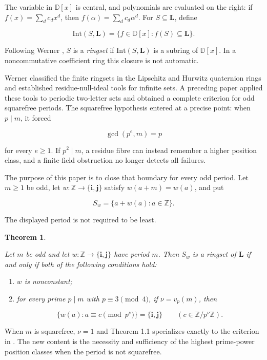 \documentclass[11pt]{article}
\newtheorem{theorem}{Theorem}[section]
\numberwithin{equation}{section}
\begin{document}
The variable in $\mathbb D[x]$ is central, and polynomials are evaluated on
the right: if $f(x)=\sum_d c_dx^d$, then
$f(\alpha)=\sum_d c_d\alpha^d$. For $S\subseteq\mathbf L$, define

\[
\mathrm{Int}(S,\mathbf L)
=\{f\in\mathbb D[x]:f(S)\subseteq\mathbf L\}.
\]

Following Werner \cite{werner2026}, $S$ is a \emph{ringset} if
$\mathrm{Int}(S,\mathbf L)$ is a subring of $\mathbb D[x]$. In a
noncommutative coefficient ring this closure is not automatic.

Werner \cite{werner2026} classified the finite ringsets in the Lipschitz and Hurwitz
quaternion rings and established residue-null-ideal tools for infinite
sets. A preceding paper \cite{carptopus2026} applied these tools to periodic two-letter sets
and obtained a complete criterion for odd squarefree periods. The
squarefree hypothesis entered at a precise point: when $p\mid m$, it forced

\[
\gcd(p^e,m)=p
\]

for every $e\ge1$. If $p^2\mid m$, a residue fibre can instead remember a
higher position class, and a finite-field obstruction no longer detects all
failures.

The purpose of this paper is to close that boundary for every odd period.
Let $m\ge1$ be odd, let $w:\mathbb Z\to\{\mathbf i,\mathbf j\}$ satisfy
$w(a+m)=w(a)$, and put

\[
S_w=\{a+w(a):a\in\mathbb Z\}.
\]

The displayed period is not required to be least.

\begin{theorem}
\label{thm:main}

Let $m$ be odd and let $w:\mathbb Z\to\{\mathbf i,\mathbf j\}$ have
period $m$. Then $S_w$ is a ringset of $\mathbf L$ if and only if both of the
following conditions hold:

\begin{enumerate}
\item $w$ is nonconstant;
\item for every prime $p\mid m$ with $p\equiv3\pmod4$, if
$\nu=v_p(m)$, then

$$
\{w(a):a\equiv c\pmod {p^\nu}\}
=\{\mathbf i,\mathbf j\}
\qquad(c\in\mathbb Z/p^\nu\mathbb Z).
$$

\end{enumerate}

\end{theorem}

When $m$ is squarefree, $\nu=1$ and Theorem 1.1 specializes exactly to the
criterion in \cite{carptopus2026}. The new content is the necessity and sufficiency of the
highest prime-power position classes when the period is not squarefree.
\end{document}
